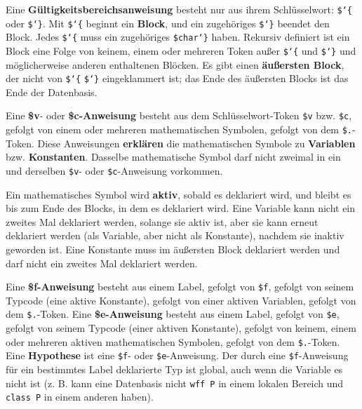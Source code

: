 Eine {\bf Gültigkeitsbereichsanweisung} besteht nur aus ihrem Schlüsselwort: \texttt{\$\char`\{} oder \texttt{\$\char`\}}. Mit \texttt{\$\char`\{} beginnt ein {\bf Block}, und ein zugehöriges \texttt{\$\char`\}} beendet den Block. Jedes \texttt{\$\char`\{} muss ein zugehöriges \texttt{\$char`\}} haben. Rekursiv definiert ist ein Block eine Folge von keinem, einem oder mehreren Token außer \texttt{\$\char`\{} und \texttt{\$\char`\}} und möglicherweise anderen enthaltenen Blöcken.  Es gibt einen {\bf äußersten Block}, der nicht von \texttt{\$\char`\{} \texttt{\$\char`\}} eingeklammert ist; das Ende des äußersten Blocks ist das Ende der Datenbasis.



Eine {\bf \$v}- oder {\bf \$c-Anweisung} besteht aus dem Schlüsselwort-Token \texttt{\$v} bzw. \texttt{\$c}, gefolgt von einem oder mehreren mathematischen Symbolen,
gefolgt von dem \texttt{\$.}-Token. Diese Anweisungen {\bf erklären} die mathematischen Symbole zu {\bf Variablen} bzw. {\bf Konstanten}. Dasselbe mathematische Symbol darf nicht zweimal in ein und derselben \texttt{\$v}- oder \texttt{\$c}-Anweisung vorkommen.


Ein mathematisches Symbol wird {\bf aktiv}, sobald es deklariert wird, und bleibt es bis zum Ende des Blocks, in dem es deklariert wird.  Eine Variable kann nicht ein zweites Mal deklariert werden, solange sie aktiv ist, aber sie kann erneut deklariert werden (als Variable, aber nicht als Konstante), nachdem sie inaktiv geworden ist.  Eine Konstante muss im äußersten Block deklariert werden und darf nicht ein zweites Mal deklariert werden.

Eine {\bf \$f-Anweisung} besteht aus einem Label, gefolgt von \texttt{\$f}, gefolgt von seinem Typcode (eine aktive Konstante), gefolgt von einer aktiven Variablen, gefolgt von dem \texttt{\$.}-Token.  Eine {\bf \$e-Anweisung} besteht aus einem Label, gefolgt von \texttt{\$e}, gefolgt von seinem Typcode (einer aktiven Konstante), gefolgt von keinem, einem oder mehreren aktiven mathematischen Symbolen, gefolgt von dem \texttt{\$.}-Token.  Eine {\bf Hypothese} ist eine \texttt{\$f}- oder \texttt{\$e}-Anweisung. Der durch eine \texttt{\$f}-Anweisung für ein bestimmtes Label deklarierte Typ ist global, auch wenn die Variable es nicht ist (z. B. kann eine Datenbasis nicht \texttt{wff P} in einem lokalen Bereich und \texttt{class P} in einem anderen haben).

